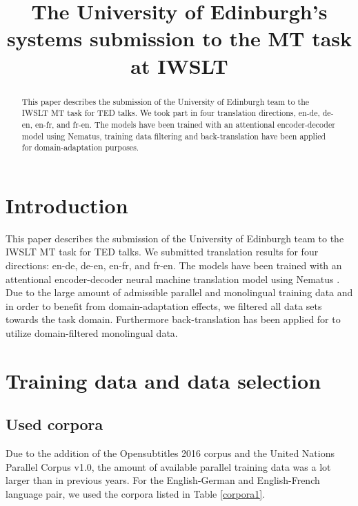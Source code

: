 \documentclass[11pt]{article}
\title{The University of Edinburgh's systems submission to the MT task at IWSLT}
\date{}
\begin{document}
 \maketitle
\begin{abstract}
This paper describes the submission of the University of Edinburgh team to the IWSLT MT task for TED talks. We took part in four translation directions, en-de, de-en, en-fr, and fr-en. The models have been trained with an attentional encoder-decoder model using Nematus, training data filtering and back-translation have been applied for domain-adaptation purposes. 
\end{abstract}

\section{Introduction}
This paper describes the submission of the University of Edinburgh team to the IWSLT MT task for TED talks. We submitted translation results for four directions: en-de, de-en, en-fr, and fr-en. 
The models have been trained with an attentional encoder-decoder neural machine translation model using Nematus \cite{DBLP:conf/wmt/SennrichHB16}. 
Due to the large amount of admissible parallel and monolingual training data and in order to benefit from domain-adaptation effects, we filtered all data sets towards the task domain. Furthermore back-translation has been applied for to utilize domain-filtered monolingual data. 


\section{Training data and data selection}

\subsection{Used corpora}

Due to the addition of the Opensubtitles 2016 corpus and the United Nations Parallel Corpus v1.0, the amount of available parallel training data was a lot larger than in previous years. For the English-German and English-French language pair, we used the corpora listed in Table \ref{corpora1}.
\end{document}

